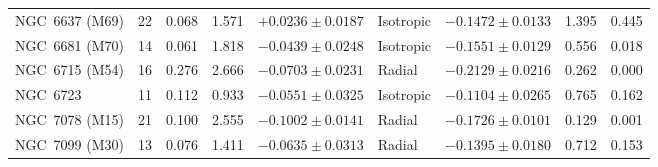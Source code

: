 \begin{table}
\begin{tabular}{lrrrclcrr}
NGC~6637 (M69) & 22 & 0.068 & 1.571 & $+0.0236\pm0.0187$ & Isotropic & $-0.1472\pm0.0133$ & 1.395 & 0.445 \\
NGC~6681 (M70) & 14 & 0.061 & 1.818 & $-0.0439\pm0.0248$ & Isotropic & $-0.1551\pm0.0129$ & 0.556 & 0.018 \\
NGC~6715 (M54) & 16 & 0.276 & 2.666 & $-0.0703\pm0.0231$ & Radial & $-0.2129\pm0.0216$ & 0.262 & 0.000 \\
NGC~6723 & 11 & 0.112 & 0.933 & $-0.0551\pm0.0325$ & Isotropic & $-0.1104\pm0.0265$ & 0.765 & 0.162 \\
NGC~7078 (M15) & 21 & 0.100 & 2.555 & $-0.1002\pm0.0141$ & Radial & $-0.1726\pm0.0101$ & 0.129 & 0.001 \\
NGC~7099 (M30) & 13 & 0.076 & 1.411 & $-0.0635\pm0.0313$ & Radial & $-0.1395\pm0.0180$ & 0.712 & 0.153 \\
\hline
\end{tabular}
\end{table}